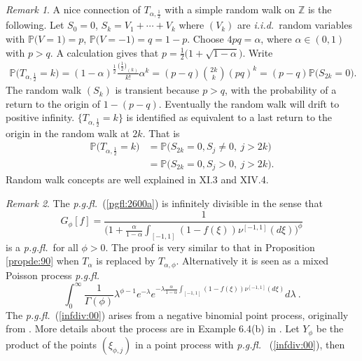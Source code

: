 \documentclass[preprint,11pt]{elsarticle}
\theoremstyle{remark}
\newtheorem{Remark}{Remark}
\def\spin{{[-1,1]}}
\def\pgfl{\emph{p.g.fl.~}}
\def\iid{\emph{i.i.d.}~}
\begin{document}
{\begin{Remark}
A nice connection of $T_{\alpha,\frac{1}{2}}$ with a simple random walk on $\mathbb{Z}$ is the following.
Let
$S_0=0$, $S_k=V_1+\cdots +V_k$ where $(V_k)$ are \iid random variables with
$\mathbb{P}\big (V=1) = p$, $\mathbb{P}\big (V=-1) = q=1-p$. Choose $4pq = \alpha$, where $\alpha \in (0,1)$ with $p>q$. A calculation gives that $p=\frac{1}{2}\big ( 1 + \sqrt{1-\alpha})$.
Write
\begin{align*}
\mathbb{P}\big (T_{\alpha,\frac{1}{2}}= k\big )
=  (1-\alpha)^{\frac{1}{2}}
\frac{\Big (\frac{1}{2}\Big )_{(k)}}{k!}\alpha^k
= (p-q){2k\choose k}(pq)^k
= (p-q)\mathbb{P}\big (S_{2k}=0\big ).
\end{align*}
The random walk $(S_k)$ is transient because $p > q$, with the probability of a return to the origin of $1 - (p-q)$. 
Eventually the random walk will drift to positive infinity. $\big \{T_{\alpha,\frac{1}{2}}=k\big \}$ is identified as equivalent to a last return to the origin in the random walk at $2k$. That is
\begin{align*}
\mathbb{P}\big (T_{\alpha,\frac{1}{2}}= k\big )
 &= \mathbb{P}\big (S_{2k}=0, S_j \ne 0,\ j > 2k \big ) \nonumber \\
 &=  \mathbb{P}\big (S_{2k}=0, S_j > 0,\ j > 2k \big ).
\end{align*}
Random walk concepts are well explained in \cite{F1991} XI.3 and XIV.4.
\end{Remark}
\begin{Remark}\label{remid:00}
The \pgfl (\ref{pgfl:2600a}) is infinitely divisible in the sense that
\begin{equation}
G_\phi[f]=
\frac{1}{\Big (1+\frac{\alpha}{1-\alpha}\int_{[-1,1]}(1-f(\xi))\nu^\spin(d\xi)\Big )^\phi}
\label{infdiv:00}
\end{equation}
is a \pgfl for all $\phi > 0$. The proof is very similar to that in Proposition \ref{propde:90} when $T_\alpha$ is replaced by $T_{\alpha,\phi}$. 
Alternatively it is seen as a mixed Poisson process \pgfl
\begin{equation*}
\int_0^\infty
\frac{1}{\Gamma(\phi)}\lambda^{\phi - 1}
e^{-\lambda}e^{-\lambda \frac{\alpha}{1-\alpha}\int_{[-1,1]}(1-f(\xi))\nu^\spin(d\xi)}
d\lambda\ .
\label{Poissonphi:00}
\end{equation*}
The \pgfl (\ref{infdiv:00}) arises from a negative binomial point process, originally from  \cite{G1984}. More details about the process are in Example 6.4(b) in \citet{DVJ2003}.
Let $Y_\phi$ be the product of the points $(\xi_{\phi,j})$ in a point process with \pgfl
(\ref{infdiv:00}), then 

\end{Remark}}
\end{document}
